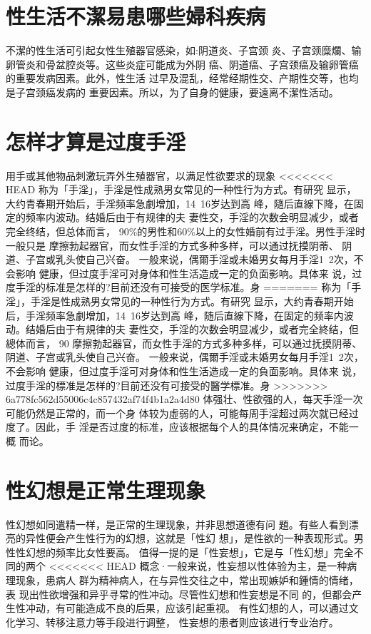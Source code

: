 \documentclass[12pt,UTF8]{ctexbook}
\begin{document}
\section{性生活不潔易患哪些婦科疾病}

不潔的性生活可引起女性生殖器官感染，如:阴道炎、子宫颈
炎、子宫颈糜爛、输卵管炎和骨盆腔炎等。这些炎症可能成为外阴
癌、阴道癌、子宫颈癌及输卵管癌的重要发病因素。此外，性生活
过早及混乱，经常经期性交、产期性交等，也均是子宫颈癌发病的
重要因素。所以，为了自身的健康，要遠离不潔性活动。

\section{怎样才算是过度手淫}

用手或其他物品刺激玩弄外生殖器官，以满足性欲要求的现象
<<<<<<< HEAD
称为「手淫」，手淫是性成熟男女常见的一种性行为方式。有研究
显示，大约青春期开始后，手淫频率急劇增加，14~16岁达到高
峰，隨后直線下降，在固定的频率内波动。结婚后由于有规律的夫
妻性交，手淫的次数会明显减少，或者完全终结，但总体而言，
90\%的男性和60\%以上的女性婚前有过手淫。男性手淫时一般只是
摩擦勃起器官，而女性手淫的方式多种多样，可以通过抚摸阴蒂、
阴道、子宫或乳头使自己兴奋。
一般来说，偶爾手淫或未婚男女每月手淫1~2次，不会影响
健康，但过度手淫可对身体和性生活造成一定的负面影响。具体来
说，过度手淫的标准是怎样的?目前还没有可接受的医学标准。身
=======
称为「手淫」，手淫是性成熟男女常见的一种性行为方式。有研究
显示，大约青春期开始后，手淫频率急劇增加，14~16岁达到高
峰，随后直線下降，在固定的频率内波动。结婚后由于有規律的夫
妻性交，手淫的次数会明显减少，或者完全終结，但總体而言，
90%
摩擦勃起器官，而女性手淫的方式多种多样，可以通过抚摸阴蒂、
阴道、子宫或乳头使自己兴奋。
一般来说，偶爾手淫或未婚男女每月手淫1~2次，不会影响
健康，但过度手淫可对身体和性生活造成一定的負面影响。具体来
说，过度手淫的標准是怎样的?目前还没有可接受的醫学標准。身
>>>>>>> 6a778fc562d55006c4c857432af74f4b1a2a4d80
体强壮、性欲强的人，每天手淫一次可能仍然是正常的，而一个身
体较为虛弱的人，可能每周手淫超过两次就已经过度了。因此，手
淫是否过度的标准，应该根据每个人的具体情况来确定，不能一概
而论。
\section{性幻想是正常生理现象}
性幻想如同遣精一样，是正常的生理现象，并非思想道德有问
題。有些人看到漂亮的异性便会产生性行为的幻想，这就是「性幻
想」，是性欲的一种表现形式。男性性幻想的频率比女性要高。
值得一提的是「性妄想」，它是与「性幻想」完全不同的两个
<<<<<<< HEAD
概念·一般来说，性妄想以性体验为主，是一种病理现象，患病人
群为精神病人，在与异性交往之中，常出现嫉妒和鍾情的情绪，表
现出性欲增强和异乎寻常的性冲动。尽管性幻想和性妄想是不同
的，但都会产生性冲动，有可能造成不良的后果，应该引起重视。
有性幻想的人，可以通过文化学习、转移注意力等手段进行调整，
性妄想的患者则应该进行专业治疗。
\end{document}
